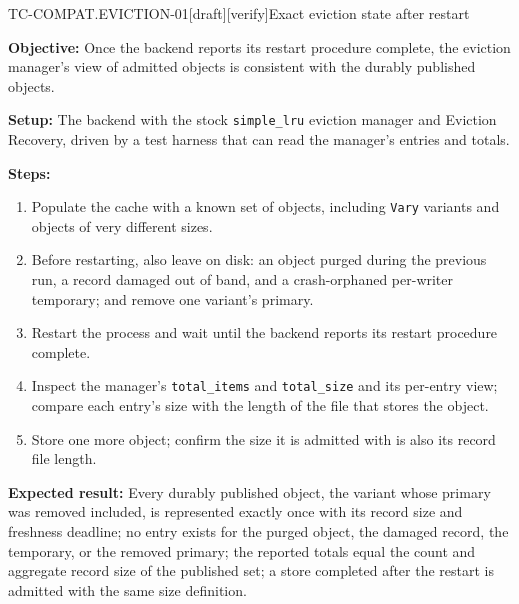 \begin{requirement}{TC-COMPAT.EVICTION-01}[draft][verify]{Exact eviction state after restart}


  \textbf{Objective:} Once the backend reports its restart procedure
  complete, the eviction manager's view of admitted objects is consistent
  with the durably published objects.

  \textbf{Setup:} The backend with the stock \texttt{simple\_lru} eviction
  manager and Eviction Recovery, driven by a test harness that can read the
  manager's entries and totals.

  \textbf{Steps:}
  \begin{enumerate}
    \item Populate the cache with a known set of objects, including
      \texttt{Vary} variants and objects of very different sizes.
    \item Before restarting, also leave on disk: an object purged during the
      previous run, a record damaged out of band, and a crash-orphaned
      per-writer temporary; and remove one variant's primary.
    \item Restart the process and wait until the backend reports its restart
      procedure complete.
    \item Inspect the manager's \texttt{total\_items} and \texttt{total\_size} and
      its per-entry view; compare each entry's size with the length of the
      file that stores the object.
    \item Store one more object; confirm the size it is admitted with is also
      its record file length.
  \end{enumerate}

  \textbf{Expected result:} Every durably published object, the variant whose
  primary was removed included, is represented exactly once with its record
  size and freshness deadline; no entry exists for the purged object, the
  damaged record, the temporary, or the removed primary; the reported totals
  equal the count and aggregate record size of the
  published set; a store completed after the restart is admitted with the same
  size definition.



\end{requirement}

